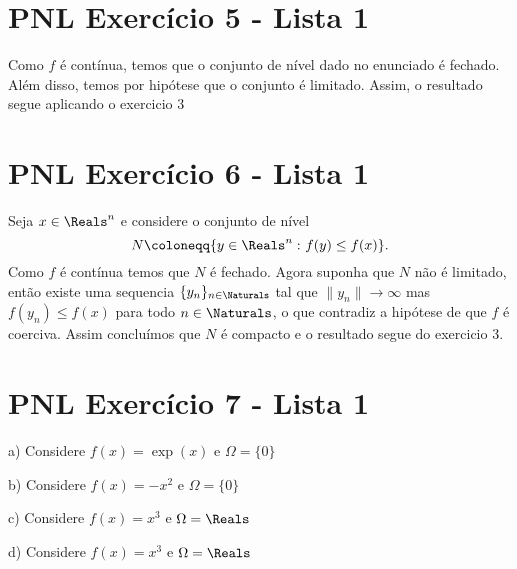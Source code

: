 \section{PNL Exercício 5 - Lista 1}
\label{sec:org5714b88}

Como \(f\) é contínua, temos que o conjunto de nível dado no enunciado é fechado. Além disso, temos
por hipótese que o conjunto é limitado. Assim, o resultado segue aplicando o exercicio 3

\section{PNL Exercício 6 - Lista 1}
\label{sec:orga03c240}

Seja \(x\in\Reals^n\) e considere o conjunto de nível \[N\coloneqq\{y\in\Reals^n\,\colon f(y)\leq f(x)\}.\]
Como \(f\) é contínua temos que \(N\) é fechado. Agora suponha que \(N\) não é limitado,
então existe uma sequencia \(\{y_n\}_{n\in\Naturals}\) tal que \(\|y_n\|\rightarrow\infty\) mas \(f(y_n)\leq f(x)\) para
todo \(n\in\Naturals\), o que contradiz a hipótese de que \(f\) é coerciva. Assim concluímos que \(N\) é compacto e o resultado 
segue do exercicio 3.

\section{PNL Exercício 7 - Lista 1}
\label{sec:org290910a}
a) Considere \(f(x)=\exp(x)\) e \(\Omega=\{0\}\)

b) Considere \(f(x)=-x^2\) e \(\Omega=\{0\}\)

c) Considere \(f(x)=x^3\) e \(\Omega=\Reals\)

d) Considere \(f(x)=x^3\) e \(\Omega=\Reals\)

